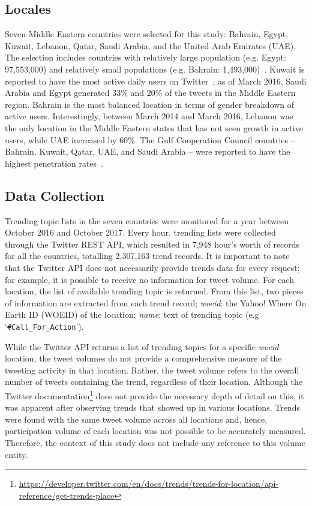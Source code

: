 \documentclass[utf8]{frontiersSCNS} %
\begin{document}
\subsection{Locales}

Seven Middle Eastern countries were selected for this study: Bahrain, Egypt, Kuwait, Lebanon, Qatar, Saudi Arabia, and the United Arab Emirates (UAE). The selection includes countries with relatively large population (e.g. Egypt: 97,553,000) and relatively small populations (e.g. Bahrain: 1,493,000)~\cite{UnitedNationsDepartmentofEconomicandSocialAffairs2017}. Kuwait is reported to have the most active daily users on Twitter~\cite{Salem2017}; as of March 2016, Saudi Arabia and Egypt generated 33\% and 20\% of the tweets in the Middle Eastern region. Bahrain is the most balanced location in terms of gender breakdown of active users. Interestingly, between March 2014 and March 2016, Lebanon was the only location in the Middle Eastern states that has not seen growth in active users, while UAE increased by 60\%. The Gulf Cooperation Council countries -- Bahrain, Kuwait, Qatar, UAE, and Saudi Arabia -- were reported to have the highest penetration rates~\cite{Salem2017}.

\subsection{Data Collection}

Trending topic lists in the seven countries were monitored for a year between October 2016 and October 2017. Every hour, trending lists were collected through the Twitter REST API, which resulted in 7,948 hour's worth of records for all the countries, totalling 2,307,163 trend records. It is important to note that the Twitter API does not necessarily provide trends data for every request; for example, it is possible to receive no information for tweet volume. For each location, the list of available trending topic is returned. From this list, two pieces of information are extracted from each trend record; {\emph{woeid}}: the Yahoo! Where On Earth ID (WOEID) of the location; {\emph{name}}: text of trending topic (e.g `{\texttt{\#Call\_For\_Action}}').

While the Twitter API returns a list of trending topics for a specific {\emph{woeid}} location, the tweet volumes do not provide a comprehensive measure of the tweeting activity in that location. Rather, the tweet volume refers to the overall number of tweets containing the trend, regardless of their location. Although the Twitter documentation\footnote{\url{https://developer.twitter.com/en/docs/trends/trends-for-location/api-reference/get-trends-place}} does not provide the necessary depth of detail on this, it was apparent after observing trends that showed up in various locations. Trends were found with the same tweet volume across all locations and, hence, participation volume of each location was not possible to be accurately measured. Therefore, the context of this study does not include any reference to this volume entity.
\end{document}
